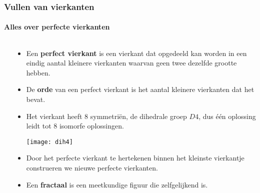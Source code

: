 \begin{frame}
  \frametitle{Vullen van vierkanten}
  \framesubtitle{Alles over perfecte vierkanten}
  \begin{columns}
    \begin{column}{0.4\textwidth}
      \only<1-3>{}
    \end{column}
    \begin{column}{0.6\textwidth}
    {\scriptsize
      \begin{itemize}
        \item Een {\bf perfect vierkant} is een vierkant dat opgedeeld kan worden in een eindig aantal kleinere vierkanten waarvan geen twee dezelfde grootte hebben.
        \item De {\bf orde} van een perfect vierkant is het aantal kleinere vierkanten dat het bevat.
        \pause
        \item Het vierkant heeft $8$ symmetri\"en, de dihedrale groep $D4$, dus \'e\'en oplossing leidt tot 8 isomorfe oplossingen.
          \begin{center}
            \texttt{[image: dih4]}
          \end{center}
        \pause
        \item Door het perfecte vierkant te hertekenen binnen het kleinste vierkantje construeren we nieuwe perfecte vierkanten.
        \item Een {\bf fractaal} is een meetkundige figuur die zelfgelijkend is. 
      \end{itemize}
    }
    \end{column}
  \end{columns}  
\end{frame}

